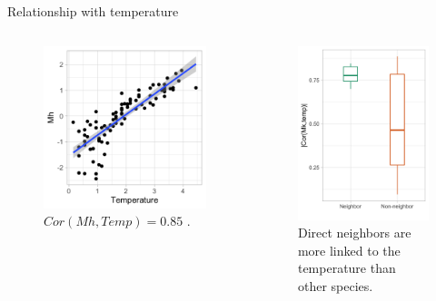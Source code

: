 \documentclass[11pt]{beamer}
\begin{document}
    \begin{frame}{Relationship with temperature}
 
  \begin{columns}
\begin{column}{0.5\linewidth}
\begin{figure}
  \includegraphics[width=0.9\linewidth]{images/Barents_MH.png}
  \caption{$Cor(Mh, Temp)=0.85$ .}
  \end{figure}
  \end{column}
  \begin{column}{0.5\linewidth}
  \begin{figure}
  \includegraphics[width=0.6\linewidth]{images/Barents_neighb_cor.png}
  \caption{Direct neighbors are more linked to the temperature than other species.}
  \end{figure}
  \end{column}
  \end{columns}
  \end{frame}
 
\end{document}
